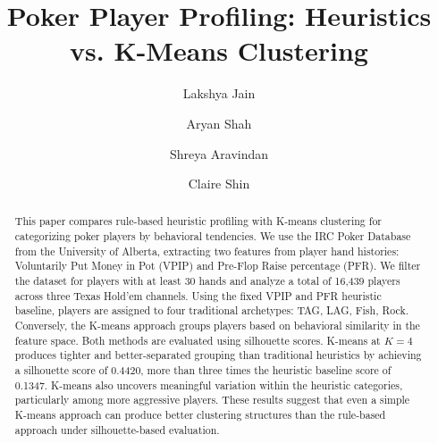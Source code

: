 \documentclass[sigconf]{acmart}
\begin{document}
\title{Poker Player Profiling: Heuristics vs. K-Means Clustering}

\author{Lakshya Jain}

\author{Aryan Shah}

\author{Shreya Aravindan}

\author{Claire Shin}

\begin{abstract}
This paper compares rule-based heuristic profiling with K-means clustering for categorizing poker players by behavioral tendencies. We use the IRC Poker Database from the University of Alberta, extracting two features from player hand histories: Voluntarily Put Money in Pot (VPIP) and Pre-Flop Raise percentage (PFR). We filter the dataset for players with at least 30 hands and analyze a total of 16,439 players across three Texas Hold'em channels. Using the fixed VPIP and PFR heuristic baseline, players are assigned to four traditional archetypes: TAG, LAG, Fish, Rock. Conversely, the K-means approach groups players based on behavioral similarity in the feature space. Both methods are evaluated using silhouette scores. K-means at $K=4$ produces tighter and better-separated grouping than traditional heuristics by achieving a silhouette score of 0.4420, more than three times the heuristic baseline score of 0.1347. K-means also uncovers meaningful variation within the heuristic categories, particularly among more aggressive players. These results suggest that even a simple K-means approach can produce better clustering structures than the rule-based approach under silhouette-based evaluation.
\end{abstract}

\end{document}
